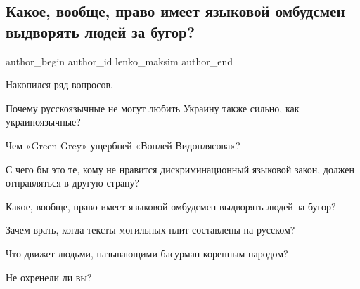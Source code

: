  
 
 
 
 
 
\subsection{Какое, вообще, право имеет языковой омбудсмен выдворять людей за бугор?}
\label{sec:07_08_2021.fb.lenko_maksim.1.ukrainizacia}
 
\ifcmt
 author_begin
   author_id lenko_maksim
 author_end
\fi

Накопился ряд вопросов.

Почему русскоязычные не могут любить Украину также сильно, как украиноязычные? 

Чем «Green Grey» ущербней «Воплей Видоплясова»?

С чего бы это те, кому не нравится дискриминационный языковой закон, должен
отправляться в другую страну?

Какое, вообще, право имеет языковой омбудсмен выдворять людей за бугор? 

Зачем врать, когда тексты могильных плит составлены на русском?

Что движет людьми, называющими басурман коренным народом?

Не охренели ли вы?


